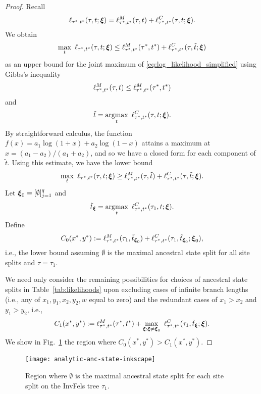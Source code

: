 \begin{proof}
Recall
\[
\ell_{\tau^*,t^*}(\tau, t; \boldsymbol\xi) = \ell^M_{\tau^*,t^*}(\tau,t) + \ell^C_{\tau^*,t^*}(\tau, t; \boldsymbol\xi).
\]
We obtain
\[
\max_{t} \ \ell_{\tau^*,t^*}(\tau, t; \boldsymbol\xi) \le
    \ell^M_{\tau^*,t^*}(\tau^*,t^*)
    + \ell^C_{\tau^*,t^*}(\tau, \tilde{t}; \boldsymbol\xi)
\]
as an upper bound for the joint maximum of \eqref{eq:log_likelihood_simplified} using Gibbs's inequality
\[
\ell^M_{\tau^*,t^*}(\tau,t) \le \ell^M_{\tau^*,t^*}(\tau^*,t^*)
\]
and
\[
\tilde{t} = \argmax_{t} \ \ell^C_{\tau^*,t^*}(\tau, t; \boldsymbol\xi).
\]
By straightforward calculus, the function $f(x)=a_1\log(1+x)+a_2\log(1-x)$ attains a maximum at $\hat{x} = (a_1-a_2)/(a_1+a_2)$, and so we have a closed form for each component of $\tilde{t}$.
Using this estimate, we have the lower bound
\[
\max_{t} \ \ell_{\tau^*,t^*}(\tau, t; \boldsymbol\xi) \ge
    \ell^M_{\tau^*,t^*}(\tau,\tilde{t})
    + \ell^C_{\tau^*,t^*}(\tau, \tilde{t}; \boldsymbol\xi).
\]
Let $\boldsymbol\xi_0 = [\emptyset]_{j=1}^q$ and
\[
\tilde{t}_{\boldsymbol\xi} = \argmax_{t} \ \ell^C_{\tau^*,t^*}(\tau_1, t; \boldsymbol\xi).
\]
Define
\[
C_0(x^*, y^*) :=
    \ell^M_{\tau^*,t^*}(\tau_1,\tilde{t}_{\boldsymbol\xi_0})
    + \ell^C_{\tau^*,t^*}(\tau_1, \tilde{t}_{\boldsymbol\xi_0}; \boldsymbol\xi_0),
\]
i.e., the lower bound assuming $\emptyset$ is the maximal ancestral state split for all site splits and $\tau=\tau_1$.

We need only consider the remaining possibilities for choices of ancestral state splits in Table~\ref{tab:likelihoods} upon excluding cases of infinite branch lengths (i.e., any of $x_1,y_1,x_2,y_2,w$ equal to zero) and the redundant cases of $x_1 > x_2$ and $y_1 > y_2$, i.e.,
\[
C_1(x^*, y^*) :=
    \shannonDivergence_{\tau^*,t^*}(\tau^*,t^*)
    +  \max_{\boldsymbol\xi : \boldsymbol\xi \neq \boldsymbol\xi_0} \ \ell^C_{\tau^*,t^*}(\tau_1, \tilde{t}_{\boldsymbol\xi}; \boldsymbol\xi).
\]
We show in Fig.~\ref{fig:max-anc-state} the region where $C_0(x^*,y^*) > C_1(x^*,y^*)$.
\end{proof}

\begin{figure}
\centering
\texttt{[image: analytic-anc-state-inkscape]}
\caption{
Region where $\emptyset$ is the maximal ancestral state split for each site split on the InvFels tree $\tau_1$.
}
\label{fig:max-anc-state}
\end{figure}

